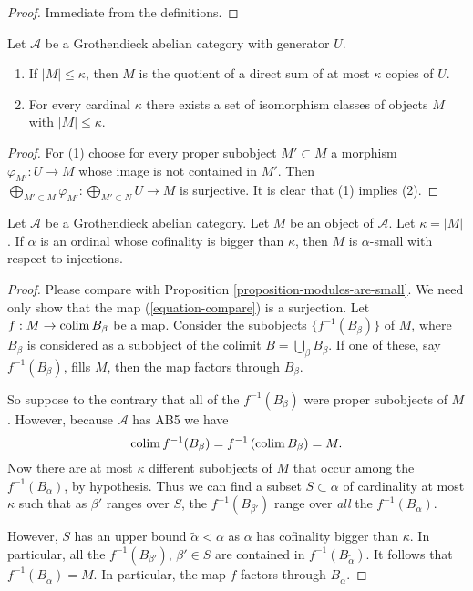 \begin{proof}
Immediate from the definitions.
\end{proof}

\begin{lemma}
\label{lemma-set-iso-classes-bounded-size}
Let $\mathcal{A}$ be a Grothendieck abelian category with generator $U$.
\begin{enumerate}
\item If $|M| \leq \kappa$, then $M$ is the quotient of a direct
sum of at most $\kappa$ copies of $U$.
\item For every cardinal $\kappa$ there exists a set of isomorphism classes
of objects $M$ with $|M| \leq \kappa$.
\end{enumerate}
\end{lemma}

\begin{proof}
For (1) choose for every proper subobject $M' \subset M$ a morphism
$\varphi_{M'} : U \to M$ whose image is not contained in $M'$. Then
$\bigoplus_{M' \subset M} \varphi_{M'} : \bigoplus_{M' \subset N} U \to M$
is surjective. It is clear that (1) implies (2).
\end{proof}

\begin{proposition}
\label{proposition-objects-are-small}
Let $\mathcal{A}$ be a Grothendieck abelian category. Let $M$ be an
object of $\mathcal{A}$. Let $\kappa = |M|$.
If $\alpha$ is an ordinal whose cofinality is bigger than $\kappa$,
then $M$ is $\alpha$-small with respect to injections.
\end{proposition}

\begin{proof}
Please compare with Proposition \ref{proposition-modules-are-small}.
We need only show that the map (\ref{equation-compare}) is a surjection.
Let $f : M \to \mathop{\rm colim}\nolimits B_\beta$ be a map.
Consider the subobjects $\{f^{-1}(B_\beta)\}$ of $M$, where $B_\beta$
is considered as a subobject of the colimit $B = \bigcup_\beta B_\beta$.
If one of these, say $f^{-1}(B_\beta)$, fills $M$,
then the map factors through $B_\beta$.

\medskip\noindent
So suppose to the contrary that all of the $f^{-1}(B_\beta)$ were proper
subobjects of $M$. However, because $\mathcal{A}$ has
AB5 we have
$$
\mathop{\rm colim}\nolimits f^{-1}(B_\beta) = f^{-1}\left(\mathop{\rm colim}\nolimits B_\beta\right) = M.
$$
Now there are at most $\kappa$ different subobjects of $M$ that occur among
the $f^{-1}(B_\alpha)$, by hypothesis.
Thus we can find a subset $S \subset \alpha$ of cardinality at most
$\kappa$ such that as $\beta'$ ranges over $S$, the
$f^{-1}(B_{\beta'})$ range over \emph{all} the $f^{-1}(B_\alpha)$.

\medskip\noindent
However, $S$ has an upper bound $\widetilde{\alpha} < \alpha$ as
$\alpha$ has cofinality bigger than $\kappa$. In particular, all the
$f^{-1}(B_{\beta'})$, $\beta' \in S$ are contained in
$f^{-1}(B_{\widetilde{\alpha}})$.
It follows that $f^{-1}(B_{\widetilde{\alpha}}) = M$.
In particular, the map $f$ factors through $B_{\widetilde{\alpha}}$.
\end{proof}


